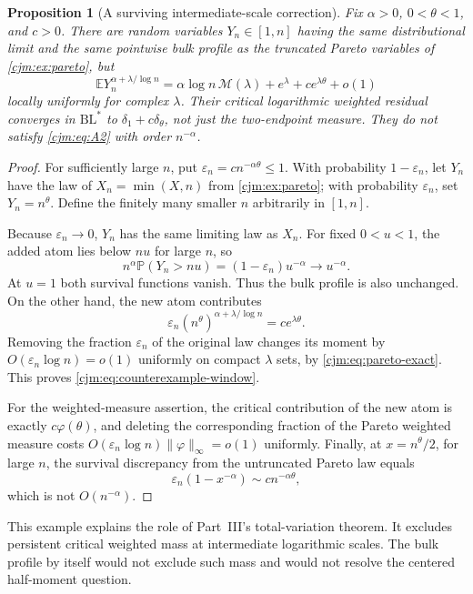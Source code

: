 \documentclass[11pt,a4paper]{article}
\newtheorem{proposition}[proposition]{Proposition}
\theoremstyle{definition}\newaliascnt{definition}{theorem}
\theoremstyle{remark}\newaliascnt{remark}{theorem}
\newcommand{\ljP}{\mathbb P}
\newcommand{\ljE}{\mathbb E}
\newcommand{\cjBL}{\mathrm{BL}}
\begin{document}
\begin{proposition}[A surviving intermediate-scale correction]
\label{cjm:prop:counterexample}
Fix $\alpha>0$, $0<\theta<1$, and $c>0$. There are random variables
$Y_n\in[1,n]$ having the same distributional limit and the same pointwise
bulk profile as the truncated Pareto variables of \cref{cjm:ex:pareto}, but
\begin{equation}
 \ljE Y_n^{\alpha+\lambda/\log n}
 =\alpha\log n\,\mathcal M(\lambda)+e^\lambda
                 +c e^{\lambda\theta}+o(1)
 \label{cjm:eq:counterexample-window}
\end{equation}
locally uniformly for complex $\lambda$. Their critical logarithmic
weighted residual converges in $\cjBL^*$ to
$\delta_1+c\delta_\theta$, not just the two-endpoint measure.
They do not satisfy \eqref{cjm:eq:A2} with order $n^{-\alpha}$.
\end{proposition}
\begin{proof}
For sufficiently large $n$, put $\varepsilon_n=c n^{-\alpha\theta}\le1$.
With probability $1-\varepsilon_n$, let $Y_n$ have the law of
$X_n=\min(X,n)$ from \cref{cjm:ex:pareto}; with probability
$\varepsilon_n$, set $Y_n=n^\theta$. Define the finitely many smaller
$n$ arbitrarily in $[1,n]$.

Because $\varepsilon_n\to0$, $Y_n$ has the same limiting law as $X_n$.
For fixed $0<u<1$, the added atom lies below $nu$ for large $n$, so
\[
 n^\alpha\ljP(Y_n>nu)=(1-\varepsilon_n)u^{-\alpha}
 \longrightarrow u^{-\alpha}.
\]
At $u=1$ both survival functions vanish. Thus the bulk profile is also
unchanged. On the other hand, the new atom contributes
\[
 \varepsilon_n(n^\theta)^{\alpha+\lambda/\log n}
                  =c e^{\lambda\theta}.
\]
Removing the fraction $\varepsilon_n$ of the original law changes its
moment by $O(\varepsilon_n\log n)=o(1)$ uniformly on compact $\lambda$
sets, by \eqref{cjm:eq:pareto-exact}. This proves
\eqref{cjm:eq:counterexample-window}.

For the weighted-measure assertion, the critical contribution of the new
atom is exactly $c\varphi(\theta)$, and deleting the corresponding
fraction of the Pareto weighted measure costs
$O(\varepsilon_n\log n)\|\varphi\|_\infty=o(1)$ uniformly. Finally,
at $x=n^\theta/2$, for large $n$, the survival discrepancy from the
untruncated Pareto law equals
\[
 \varepsilon_n(1-x^{-\alpha})\sim c n^{-\alpha\theta},
\]
which is not $O(n^{-\alpha})$.
\end{proof}

This example explains the role of Part~III's total-variation theorem.
It excludes persistent critical weighted mass at intermediate logarithmic
scales. The bulk profile by itself would not exclude such mass and would
not resolve the centered half-moment question.
\end{document}

